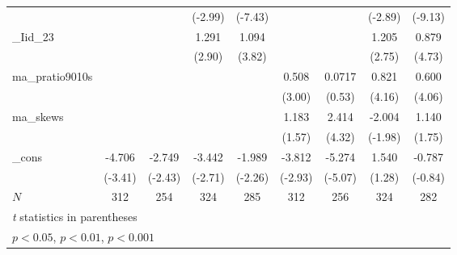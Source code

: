 {\begin{tabular}{l*{8}{c}}
            &                     &                     &     (-2.99)         &     (-7.43)         &                     &                     &     (-2.89)         &     (-9.13)         \\
[1em]
\_Iid\_23     &                     &                     &       1.291\sym{**} &       1.094\sym{***}&                     &                     &       1.205\sym{**} &       0.879\sym{***}\\
            &                     &                     &      (2.90)         &      (3.82)         &                     &                     &      (2.75)         &      (4.73)         \\
[1em]
ma\_pratio9010s&                     &                     &                     &                     &       0.508\sym{**} &      0.0717         &       0.821\sym{***}&       0.600\sym{***}\\
            &                     &                     &                     &                     &      (3.00)         &      (0.53)         &      (4.16)         &      (4.06)         \\
[1em]
ma\_skews    &                     &                     &                     &                     &       1.183         &       2.414\sym{***}&      -2.004\sym{*}  &       1.140         \\
            &                     &                     &                     &                     &      (1.57)         &      (4.32)         &     (-1.98)         &      (1.75)         \\
[1em]
\_cons      &      -4.706\sym{***}&      -2.749\sym{*}  &      -3.442\sym{**} &      -1.989\sym{*}  &      -3.812\sym{**} &      -5.274\sym{***}&       1.540         &      -0.787         \\
            &     (-3.41)         &     (-2.43)         &     (-2.71)         &     (-2.26)         &     (-2.93)         &     (-5.07)         &      (1.28)         &     (-0.84)         \\
\hline
\(N\)       &         312         &         254         &         324         &         285         &         312         &         256         &         324         &         282         \\
\hline\hline
\multicolumn{9}{l}{\footnotesize \textit{t} statistics in parentheses}\\
\multicolumn{9}{l}{\footnotesize \sym{*} \(p<0.05\), \sym{**} \(p<0.01\), \sym{***} \(p<0.001\)}\\
\end{tabular}
}
